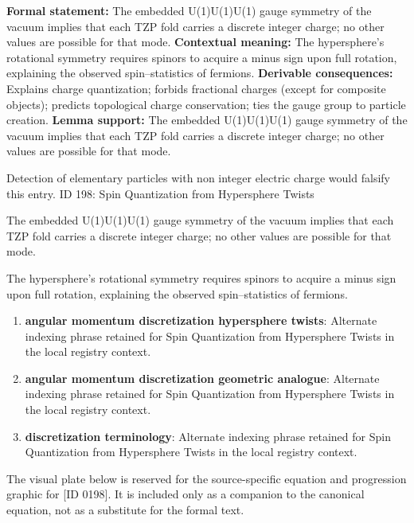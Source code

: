 \begingroup\footnotesize\setlength{\emergencystretch}{3em}\sloppy
\textbf{Formal statement:} The embedded U(1)U(1)U(1) gauge symmetry of the vacuum implies that each TZP fold carries a discrete integer charge; no other values are possible for that mode.
\textbf{Contextual meaning:} The hypersphere's rotational symmetry requires spinors to acquire a minus sign upon full rotation, explaining the observed spin--statistics of fermions.  
\textbf{Derivable consequences:} Explains charge quantization; forbids fractional charges (except for composite objects); predicts topological charge conservation; ties the gauge group to particle creation.  
\textbf{Lemma support:} The embedded U(1)U(1)U(1) gauge symmetry of the vacuum implies that each TZP fold carries a discrete integer charge; no other values are possible for that mode.\par
\endgroup

Detection of elementary particles with non integer electric charge would falsify this entry. ID 198: Spin Quantization from Hypersphere Twists  

The embedded U(1)U(1)U(1) gauge symmetry of the vacuum implies that each TZP fold carries a discrete integer charge; no other values are possible for that mode.

The hypersphere's rotational symmetry requires spinors to acquire a minus sign upon full rotation, explaining the observed spin--statistics of fermions.  
\endgroup

\begin{enumerate}[leftmargin=1.6em,itemsep=6pt,topsep=4pt]
\item \textbf{angular momentum discretization hypersphere twists}: Alternate indexing phrase retained for Spin Quantization from Hypersphere Twists in the local registry context.
\item \textbf{angular momentum discretization geometric analogue}: Alternate indexing phrase retained for Spin Quantization from Hypersphere Twists in the local registry context.
\item \textbf{discretization terminology}: Alternate indexing phrase retained for Spin Quantization from Hypersphere Twists in the local registry context.
\end{enumerate}

\begingroup\footnotesize\sloppy
The visual plate below is reserved for the source-specific equation and progression graphic for [ID 0198]. It is included only as a companion to the canonical equation, not as a substitute for the formal text.
\par\endgroup
\ifTZPDarkEdition
{}
\fi

